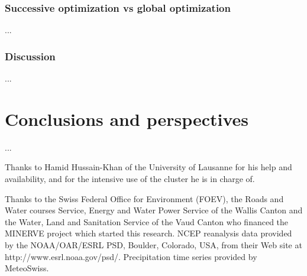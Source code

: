 \documentclass{ametsoc}
\begin{document}
\subsubsection{Successive optimization vs global optimization}
...

\subsubsection{Discussion}
...


\section{Conclusions and perspectives}
...



%
\acknowledgments
Thanks to Hamid Hussain-Khan of the University of Lausanne for his help and availability, and for the intensive use of the cluster he is in charge of.

Thanks to the Swiss Federal Office for Environment (FOEV), the Roads and Water courses Service, Energy and Water Power Service of the Wallis Canton and the Water, Land and Sanitation Service of the Vaud Canton who financed the MINERVE project which started this research. NCEP reanalysis data provided by the NOAA/OAR/ESRL PSD, Boulder, Colorado, USA, from their Web site at http://www.esrl.noaa.gov/psd/. Precipitation time series provided by MeteoSwiss. 


%



\end{document}

